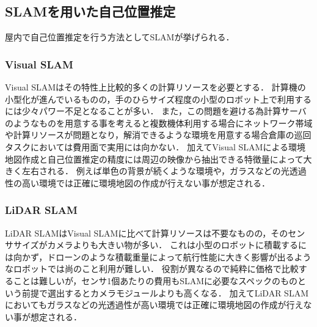 \subsection{SLAMを用いた自己位置推定}
\label{slam_problem}
屋内で自己位置推定を行う方法としてSLAMが挙げられる．

\subsubsection{Visual SLAM}
Visual SLAMはその特性上比較的多くの計算リソースを必要とする．
計算機の小型化が進んでいるものの，手のひらサイズ程度の小型のロボット上で利用するには少々パワー不足となることが多い．
また，この問題を避ける為計算サーバのようなものを用意する事を考えると複数機体利用する場合にネットワーク帯域や計算リソースが問題となり，解消できるような環境を用意する場合倉庫の巡回タスクにおいては費用面で実用には向かない．
加えてVisual SLAMによる環境地図作成と自己位置推定の精度には周辺の映像から抽出できる特徴量によって大きく左右される．
例えば単色の背景が続くような環境や，ガラスなどの光透過性の高い環境では正確に環境地図の作成が行えない事が想定される．

\subsubsection{LiDAR SLAM}
LiDAR SLAMはVisual SLAMに比べて計算リソースは不要なものの，そのセンササイズがカメラよりも大きい物が多い．
これは小型のロボットに積載するには向かず，ドローンのような積載重量によって航行性能に大きく影響が出るようなロボットでは尚のこと利用が難しい．
役割が異なるので純粋に価格で比較することは難しいが，センサ1個あたりの費用もSLAMに必要なスペックのものという前提で選出するとカメラモジュールよりも高くなる．
加えてLiDAR SLAMにおいてもガラスなどの光透過性が高い環境では正確に環境地図の作成が行えない事が想定される．